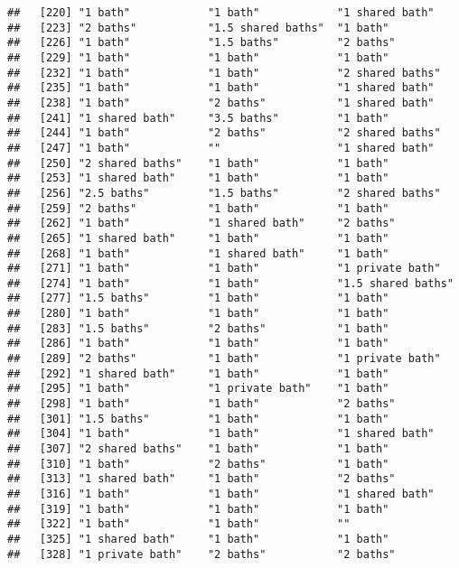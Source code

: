 \documentclass[
]{article}
\begin{document}
\begin{verbatim}
##   [220] "1 bath"            "1 bath"            "1 shared bath"    
##   [223] "2 baths"           "1.5 shared baths"  "1 bath"           
##   [226] "1 bath"            "1.5 baths"         "2 baths"          
##   [229] "1 bath"            "1 bath"            "1 bath"           
##   [232] "1 bath"            "1 bath"            "2 shared baths"   
##   [235] "1 bath"            "1 bath"            "1 shared bath"    
##   [238] "1 bath"            "2 baths"           "1 shared bath"    
##   [241] "1 shared bath"     "3.5 baths"         "1 bath"           
##   [244] "1 bath"            "2 baths"           "2 shared baths"   
##   [247] "1 bath"            ""                  "1 shared bath"    
##   [250] "2 shared baths"    "1 bath"            "1 bath"           
##   [253] "1 shared bath"     "1 bath"            "1 bath"           
##   [256] "2.5 baths"         "1.5 baths"         "2 shared baths"   
##   [259] "2 baths"           "1 bath"            "1 bath"           
##   [262] "1 bath"            "1 shared bath"     "2 baths"          
##   [265] "1 shared bath"     "1 bath"            "1 bath"           
##   [268] "1 bath"            "1 shared bath"     "1 bath"           
##   [271] "1 bath"            "1 bath"            "1 private bath"   
##   [274] "1 bath"            "1 bath"            "1.5 shared baths" 
##   [277] "1.5 baths"         "1 bath"            "1 bath"           
##   [280] "1 bath"            "1 bath"            "1 bath"           
##   [283] "1.5 baths"         "2 baths"           "1 bath"           
##   [286] "1 bath"            "1 bath"            "1 bath"           
##   [289] "2 baths"           "1 bath"            "1 private bath"   
##   [292] "1 shared bath"     "1 bath"            "1 bath"           
##   [295] "1 bath"            "1 private bath"    "1 bath"           
##   [298] "1 bath"            "1 bath"            "2 baths"          
##   [301] "1.5 baths"         "1 bath"            "1 bath"           
##   [304] "1 bath"            "1 bath"            "1 shared bath"    
##   [307] "2 shared baths"    "1 bath"            "1 bath"           
##   [310] "1 bath"            "2 baths"           "1 bath"           
##   [313] "1 shared bath"     "1 bath"            "2 baths"          
##   [316] "1 bath"            "1 bath"            "1 shared bath"    
##   [319] "1 bath"            "1 bath"            "1 bath"           
##   [322] "1 bath"            "1 bath"            ""                 
##   [325] "1 shared bath"     "1 bath"            "1 bath"           
##   [328] "1 private bath"    "2 baths"           "2 baths"          

\end{verbatim}
\end{document}
